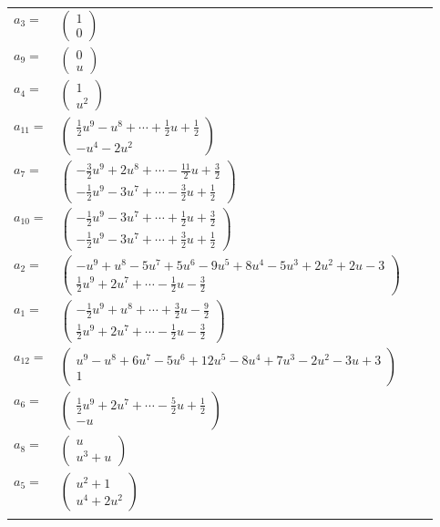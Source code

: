 \documentclass[1p]{elsarticle_modified}
\theoremstyle{definition}
\begin{document}
\begin{tabular}{m{7pt} m{180pt} m{7pt} m{180pt} }
\flushright $a_{3}=$&$\begin{pmatrix}1\\0\end{pmatrix}$ \\
\flushright $a_{9}=$&$\begin{pmatrix}0\\u\end{pmatrix}$ \\
\flushright $a_{4}=$&$\begin{pmatrix}1\\u^2\end{pmatrix}$ \\
\flushright $a_{11}=$&$\begin{pmatrix}\frac{1}{2} u^9- u^8+\cdots+\frac{1}{2} u+\frac{1}{2}\\- u^4-2 u^2\end{pmatrix}$ \\
\flushright $a_{7}=$&$\begin{pmatrix}-\frac{3}{2} u^9+2 u^8+\cdots-\frac{11}{2} u+\frac{3}{2}\\-\frac{1}{2} u^9-3 u^7+\cdots-\frac{3}{2} u+\frac{1}{2}\end{pmatrix}$ \\
\flushright $a_{10}=$&$\begin{pmatrix}-\frac{1}{2} u^9-3 u^7+\cdots+\frac{1}{2} u+\frac{3}{2}\\-\frac{1}{2} u^9-3 u^7+\cdots+\frac{3}{2} u+\frac{1}{2}\end{pmatrix}$ \\
\flushright $a_{2}=$&$\begin{pmatrix}- u^9+u^8-5 u^7+5 u^6-9 u^5+8 u^4-5 u^3+2 u^2+2 u-3\\\frac{1}{2} u^9+2 u^7+\cdots-\frac{1}{2} u-\frac{3}{2}\end{pmatrix}$ \\
\flushright $a_{1}=$&$\begin{pmatrix}-\frac{1}{2} u^9+u^8+\cdots+\frac{3}{2} u-\frac{9}{2}\\\frac{1}{2} u^9+2 u^7+\cdots-\frac{1}{2} u-\frac{3}{2}\end{pmatrix}$ \\
\flushright $a_{12}=$&$\begin{pmatrix}u^9- u^8+6 u^7-5 u^6+12 u^5-8 u^4+7 u^3-2 u^2-3 u+3\\1\end{pmatrix}$ \\
\flushright $a_{6}=$&$\begin{pmatrix}\frac{1}{2} u^9+2 u^7+\cdots-\frac{5}{2} u+\frac{1}{2}\\- u\end{pmatrix}$ \\
\flushright $a_{8}=$&$\begin{pmatrix}u\\u^3+u\end{pmatrix}$ \\
\flushright $a_{5}=$&$\begin{pmatrix}u^2+1\\u^4+2 u^2\end{pmatrix}$\\&\end{tabular}
\end{document}
